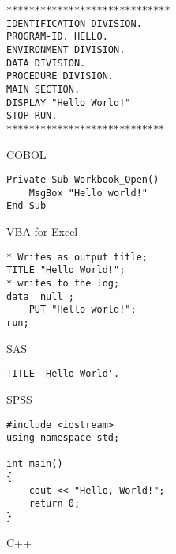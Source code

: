 \documentclass{article}
\begin{document}
\hrulefill
\begin{multicols}{2}


\begin{verbatim}
*****************************
IDENTIFICATION DIVISION.
PROGRAM-ID. HELLO.
ENVIRONMENT DIVISION.
DATA DIVISION.
PROCEDURE DIVISION.
MAIN SECTION.
DISPLAY "Hello World!"
STOP RUN.
****************************
\end{verbatim}

\columnbreak

\begin{flushright}
COBOL
\end{flushright}

\end{multicols}

\hrulefill
\begin{multicols}{2}


\begin{verbatim}
Private Sub Workbook_Open()
    MsgBox "Hello world!"
End Sub
\end{verbatim}

\columnbreak

\begin{flushright}
VBA for Excel
\end{flushright}

\end{multicols}

\hrulefill
\begin{multicols}{2}


\begin{verbatim}
* Writes as output title;
TITLE "Hello World!";
* writes to the log;
data _null_;
    PUT "Hello world!";
run;
\end{verbatim}

\columnbreak

\begin{flushright}
SAS
\end{flushright}

\end{multicols}

\hrulefill
\begin{multicols}{2}


\begin{verbatim}
TITLE 'Hello World'.
\end{verbatim}

\columnbreak

\begin{flushright}
SPSS
\end{flushright}

\end{multicols}


\hrulefill
\begin{multicols}{2}


\begin{verbatim}
#include <iostream>
using namespace std;

int main() 
{
    cout << "Hello, World!";
    return 0;
}
\end{verbatim}

\columnbreak

\begin{flushright}
C++
\end{flushright}

\end{multicols}
\end{document}
